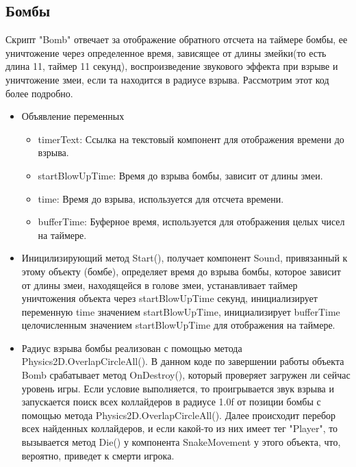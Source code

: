 \subsection{Бомбы}
Скрипт "Bomb" отвечает за отображение обратного отсчета на таймере бомбы, ее уничтожение через определенное время, зависящее от длины змейки(то есть длина 11, таймер 11 секунд), воспроизведение звукового эффекта при взрыве и уничтожение змеи, если та находится в радиусе взрыва. Рассмотрим этот код более подробно.
\begin{itemize}
    \item Объявление переменных
    \begin{itemize}
    \item timerText: Ссылка на текстовый компонент для отображения времени до взрыва.
    \item startBlowUpTime: Время до взрыва бомбы, зависит от длины змеи.
    \item time: Время до взрыва, используется для отсчета времени.
    \item bufferTime: Буферное время, используется для отображения целых чисел на таймере.
    \end{itemize}
    \item Иницилизирующий метод Start(), получает компонент Sound, привязанный к этому объекту (бомбе), определяет время до взрыва бомбы, которое зависит от длины змеи, находящейся в голове змеи, устанавливает таймер уничтожения объекта через startBlowUpTime секунд, инициализирует переменную time значением startBlowUpTime, инициализирует bufferTime целочисленным значением startBlowUpTime для отображения на таймере.
    \item Радиус взрыва бомбы реализован с помощью метода Physics2D.OverlapCircleAll(). 
    В данном коде по завершении работы объекта Bomb срабатывает метод OnDestroy(), который проверяет загружен ли сейчас уровень игры. Если условие выполняется, то проигрывается звук взрыва и запускается поиск всех коллайдеров в радиусе 1.0f от позиции бомбы с помощью метода Physics2D.OverlapCircleAll(). 
    Далее происходит перебор всех найденных коллайдеров, и если какой-то из них имеет тег "Player", то вызывается метод Die() у компонента SnakeMovement у этого объекта, что, вероятно, приведет к смерти игрока.
\end{itemize}

